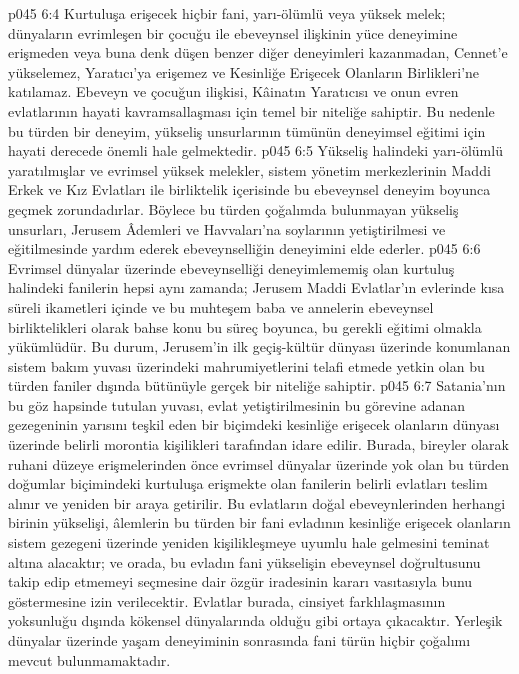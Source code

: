 \vs p045 6:4 Kurtuluşa erişecek hiçbir fani, yarı\hyp{}ölümlü veya yüksek melek; dünyaların evrimleşen bir çocuğu ile ebeveynsel ilişkinin yüce deneyimine erişmeden veya buna denk düşen benzer diğer deneyimleri kazanmadan, Cennet’e yükselemez, Yaratıcı’ya erişemez ve Kesinliğe Erişecek Olanların Birlikleri’ne katılamaz. Ebeveyn ve çocuğun ilişkisi, Kâinatın Yaratıcısı ve onun evren evlatlarının hayati kavramsallaşması için temel bir niteliğe sahiptir. Bu nedenle bu türden bir deneyim, yükseliş unsurlarının tümünün deneyimsel eğitimi için hayati derecede önemli hale gelmektedir.
\vs p045 6:5 Yükseliş halindeki yarı\hyp{}ölümlü yaratılmışlar ve evrimsel yüksek melekler, sistem yönetim merkezlerinin Maddi Erkek ve Kız Evlatları ile birliktelik içerisinde bu ebeveynsel deneyim boyunca geçmek zorundadırlar. Böylece bu türden çoğalımda bulunmayan yükseliş unsurları, Jerusem Âdemleri ve Havvaları’na soylarının yetiştirilmesi ve eğitilmesinde yardım ederek ebeveynselliğin deneyimini elde ederler.
\vs p045 6:6 Evrimsel dünyalar üzerinde ebeveynselliği deneyimlememiş olan kurtuluş halindeki fanilerin hepsi aynı zamanda; Jerusem Maddi Evlatlar’ın evlerinde kısa süreli ikametleri içinde ve bu muhteşem baba ve annelerin ebeveynsel birliktelikleri olarak bahse konu bu süreç boyunca, bu gerekli eğitimi olmakla yükümlüdür. Bu durum, Jerusem’in ilk geçiş\hyp{}kültür dünyası üzerinde konumlanan sistem bakım yuvası üzerindeki mahrumiyetlerini telafi etmede yetkin olan bu türden faniler dışında bütünüyle gerçek bir niteliğe sahiptir.
\vs p045 6:7 Satania’nın bu göz hapsinde tutulan yuvası, evlat yetiştirilmesinin bu görevine adanan gezegeninin yarısını teşkil eden bir biçimdeki kesinliğe erişecek olanların dünyası üzerinde belirli morontia kişilikleri tarafından idare edilir. Burada, bireyler olarak ruhani düzeye erişmelerinden önce evrimsel dünyalar üzerinde yok olan bu türden doğumlar biçimindeki kurtuluşa erişmekte olan fanilerin belirli evlatları teslim alınır ve yeniden bir araya getirilir. Bu evlatların doğal ebeveynlerinden herhangi birinin yükselişi, âlemlerin bu türden bir fani evladının kesinliğe erişecek olanların sistem gezegeni üzerinde yeniden kişilikleşmeye uyumlu hale gelmesini teminat altına alacaktır; ve orada, bu evladın fani yükselişin ebeveynsel doğrultusunu takip edip etmemeyi seçmesine dair özgür iradesinin kararı vasıtasıyla bunu göstermesine izin verilecektir. Evlatlar burada, cinsiyet farklılaşmasının yoksunluğu dışında kökensel dünyalarında olduğu gibi ortaya çıkacaktır. Yerleşik dünyalar üzerinde yaşam deneyiminin sonrasında fani türün hiçbir çoğalımı mevcut bulunmamaktadır.
